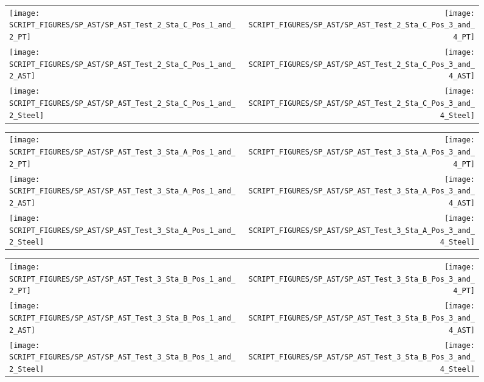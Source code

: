 \begin{figure}[!ht]
\begin{tabular*}{\textwidth}{l@{\extracolsep{\fill}}r}
\texttt{[image: SCRIPT\_FIGURES/SP\_AST/SP\_AST\_Test\_2\_Sta\_C\_Pos\_1\_and\_2\_PT]} &
\texttt{[image: SCRIPT\_FIGURES/SP\_AST/SP\_AST\_Test\_2\_Sta\_C\_Pos\_3\_and\_4\_PT]} \\
\texttt{[image: SCRIPT\_FIGURES/SP\_AST/SP\_AST\_Test\_2\_Sta\_C\_Pos\_1\_and\_2\_AST]} &
\texttt{[image: SCRIPT\_FIGURES/SP\_AST/SP\_AST\_Test\_2\_Sta\_C\_Pos\_3\_and\_4\_AST]} \\
\texttt{[image: SCRIPT\_FIGURES/SP\_AST/SP\_AST\_Test\_2\_Sta\_C\_Pos\_1\_and\_2\_Steel]} &
\texttt{[image: SCRIPT\_FIGURES/SP\_AST/SP\_AST\_Test\_2\_Sta\_C\_Pos\_3\_and\_4\_Steel]}
\end{tabular*}
\label{SP_Test_2_Station_C}
\end{figure}


\begin{figure}[!ht]
\begin{tabular*}{\textwidth}{l@{\extracolsep{\fill}}r}
\texttt{[image: SCRIPT\_FIGURES/SP\_AST/SP\_AST\_Test\_3\_Sta\_A\_Pos\_1\_and\_2\_PT]} &
\texttt{[image: SCRIPT\_FIGURES/SP\_AST/SP\_AST\_Test\_3\_Sta\_A\_Pos\_3\_and\_4\_PT]} \\
\texttt{[image: SCRIPT\_FIGURES/SP\_AST/SP\_AST\_Test\_3\_Sta\_A\_Pos\_1\_and\_2\_AST]} &
\texttt{[image: SCRIPT\_FIGURES/SP\_AST/SP\_AST\_Test\_3\_Sta\_A\_Pos\_3\_and\_4\_AST]} \\
\texttt{[image: SCRIPT\_FIGURES/SP\_AST/SP\_AST\_Test\_3\_Sta\_A\_Pos\_1\_and\_2\_Steel]} &
\texttt{[image: SCRIPT\_FIGURES/SP\_AST/SP\_AST\_Test\_3\_Sta\_A\_Pos\_3\_and\_4\_Steel]}
\end{tabular*}
\label{SP_Test_3_Station_A}
\end{figure}

\begin{figure}[!ht]
\begin{tabular*}{\textwidth}{l@{\extracolsep{\fill}}r}
\texttt{[image: SCRIPT\_FIGURES/SP\_AST/SP\_AST\_Test\_3\_Sta\_B\_Pos\_1\_and\_2\_PT]} &
\texttt{[image: SCRIPT\_FIGURES/SP\_AST/SP\_AST\_Test\_3\_Sta\_B\_Pos\_3\_and\_4\_PT]} \\
\texttt{[image: SCRIPT\_FIGURES/SP\_AST/SP\_AST\_Test\_3\_Sta\_B\_Pos\_1\_and\_2\_AST]} &
\texttt{[image: SCRIPT\_FIGURES/SP\_AST/SP\_AST\_Test\_3\_Sta\_B\_Pos\_3\_and\_4\_AST]} \\
\texttt{[image: SCRIPT\_FIGURES/SP\_AST/SP\_AST\_Test\_3\_Sta\_B\_Pos\_1\_and\_2\_Steel]} &
\texttt{[image: SCRIPT\_FIGURES/SP\_AST/SP\_AST\_Test\_3\_Sta\_B\_Pos\_3\_and\_4\_Steel]}
\end{tabular*}
\label{SP_Test_3_Station_B}
\end{figure}

